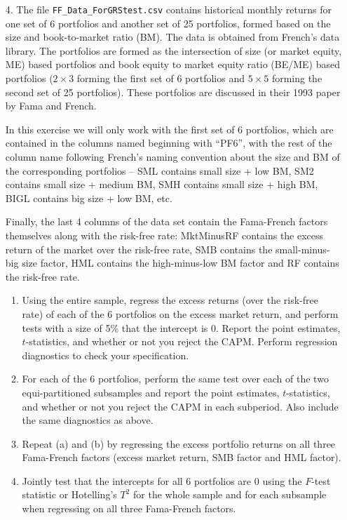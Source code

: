 \begin{enumerate}
\item[4.] The file {\tt FF\_Data\_ForGRStest.csv} contains historical monthly returns for one set of 6 portfolios and another set of 25 portfolios, formed based on the size and book-to-market ratio (BM). The data is obtained from French's data library. The portfolios are formed as the intersection of size (or market equity, ME) based portfolios and book equity to market equity ratio (BE/ME) based portfolios ($2\times 3$ forming the first set of 6 portfolios and $5\times 5$ forming the second set of 25 portfolios). These portfolios are discussed in their 1993 paper by Fama and French.

In this exercise we will only work with the first set of 6 portfolios, which are contained in the columns named beginning with ``PF6'', with the rest of the column name following French's naming convention about the size and BM of the corresponding portfolios -- SML contains small size + low BM, SM2 contains small size + medium BM, SMH contains small size + high BM, BIGL contains big size + low BM, etc.

Finally, the last 4 columns of the data set contain the Fama-French factors themselves along with the risk-free rate: MktMinusRF contains the excess return of the market over the risk-free rate, SMB contains the small-minus-big size factor, HML contains the high-minus-low BM factor and RF contains the risk-free rate.

	\begin{enumerate}
	\item Using the entire sample, regress the excess returns (over the risk-free rate) of each of the 6 portfolios on the excess market return, and perform tests with a size of 5\% that the intercept is 0. Report the point estimates, $t$-statistics, and whether or not you reject the CAPM. Perform regression diagnostics to check your specification.
	
	\item For each of the 6 portfolios, perform the same test over each of the two equi-partitioned subsamples and report the point estimates, $t$-statistics, and whether or not you reject the CAPM in each subperiod. Also include the same diagnostics as above.
	
	\item Repeat (a) and (b) by regressing the excess portfolio returns on all three Fama-French factors (excess market return, SMB factor and HML factor).
	
	\item Jointly test that the intercepts for all 6 portfolios are 0 using the $F$-test statistic or Hotelling's $T^2$ for the whole sample and for each subsample when regressing on all three Fama-French factors.
	

\end{enumerate}
\end{enumerate}
